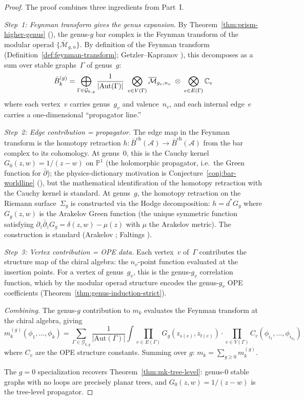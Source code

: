 \begin{proof}
The proof combines three ingredients from Part~I.

\emph{Step~1: Feynman transform gives the genus expansion.}
By Theorem~\ref{thm:prism-higher-genus} (\ClaimStatusProvedHere), the
genus-$g$ bar complex is the Feynman transform of the modular operad
$\{\overline{\mathcal{M}}_{g,n}\}$.  By definition of the Feynman
transform (Definition~\ref{def:feynman-transform}; Getzler--Kapranov
\cite{GeK98}), this decomposes as a sum over stable graphs~$\Gamma$ of
genus~$g$:
\[
\bar{B}^{(g)}_k = \bigoplus_{\Gamma \in \mathcal{G}_{k,g}}
\frac{1}{|\mathrm{Aut}(\Gamma)|}\;
\bigotimes_{v \in V(\Gamma)}
\overline{\mathcal{M}}_{g_v, n_v}
\;\otimes\; \bigotimes_{e \in E(\Gamma)} \mathbb{C}_e
\]
where each vertex~$v$ carries genus~$g_v$ and valence~$n_v$, and each
internal edge~$e$ carries a one-dimensional ``propagator line.''

\emph{Step~2: Edge contribution = propagator.}
The edge map in the Feynman transform is the homotopy retraction
$h\colon \bar{B}^{\mathrm{ch}}(\mathcal{A}) \to \bar{B}^{\mathrm{ch}}(\mathcal{A})$
from the bar complex to its cohomology.  At genus~$0$, this is the
Cauchy kernel $G_0(z,w) = 1/(z-w)$ on $\mathbb{P}^1$ (the holomorphic propagator, i.e.\ the Green function for $\bar\partial$);
the physics-dictionary motivation is
Conjecture~\ref{conj:bar-worldline} (\ClaimStatusHeuristic), but the
mathematical identification of the homotopy retraction with the Cauchy
kernel is standard.  At genus~$g$,
the homotopy retraction on the Riemann surface~$\Sigma_g$ is constructed
via the Hodge decomposition: $h = d^* G_g$ where $G_g(z,w)$ is the
Arakelov Green function (the unique symmetric function satisfying
$\partial_z \bar\partial_z G_g = \delta(z,w) - \mu(z)$ with
$\mu$ the Arakelov metric).  The construction is standard
(Arakelov \cite{Ara74}; Faltings \cite{Fal84}).

\emph{Step~3: Vertex contribution = OPE data.}
Each vertex~$v$ of~$\Gamma$ contributes the structure map of the chiral
algebra: the $n_v$-point function evaluated at the insertion points.
For a vertex of genus~$g_v$, this is the genus-$g_v$ correlation function,
which by the modular operad structure encodes the genus-$g_v$ OPE
coefficients (Theorem~\ref{thm:genus-induction-strict}).

\emph{Combining.} The genus-$g$ contribution to $m_k$ evaluates the
Feynman transform at the chiral algebra, giving
\[
m_k^{(g)}(\phi_1, \ldots, \phi_k) = \sum_{\Gamma \in \mathcal{G}_{k,g}}
\frac{1}{|\mathrm{Aut}(\Gamma)|}
\int \prod_{e \in E(\Gamma)} G_g(z_{s(e)}, z_{t(e)})
\cdot \prod_{v \in V(\Gamma)} C_v(\phi_{i_1}, \ldots, \phi_{i_{n_v}})
\]
where $C_v$ are the OPE structure constants.  Summing over $g$:
$m_k = \sum_{g \geq 0} m_k^{(g)}$.

The $g = 0$ specialization recovers Theorem~\ref{thm:mk-tree-level}:
genus-$0$ stable graphs with no loops are precisely planar trees, and
$G_0(z,w) = 1/(z-w)$ is the tree-level propagator.
\end{proof}

